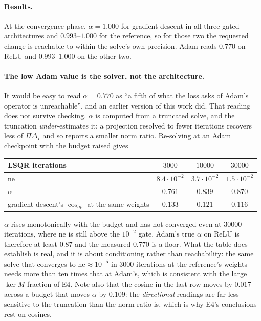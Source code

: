 \documentclass{article} %
\theoremstyle{plain}
\theoremstyle{definition}
\theoremstyle{remark}
\begin{document}
\paragraph{Results.}
At the convergence phase, $\alpha = 1.000$ for gradient descent in all three gated architectures and
$0.993$--$1.000$ for the reference, so for those two the requested change is reachable to within the
solve's own precision. Adam reads $0.770$ on ReLU and $0.993$--$1.000$ on the other two.

\paragraph{The low Adam value is the solver, not the architecture.} It would be easy to read
$\alpha = 0.770$ as ``a fifth of what the loss asks of Adam's operator is unreachable'', and an
earlier version of this work did. That reading does not survive checking. $\alpha$ is computed from
a truncated solve, and the truncation \emph{under}-estimates it: a projection resolved to fewer
iterations recovers less of $\Pi\Delta_\star$ and so reports a smaller norm ratio. Re-solving at an
Adam checkpoint with the budget raised gives

\begin{center}\small
\begin{tabular}{lccc}
\toprule
LSQR iterations & $3000$ & $10000$ & $30000$ \\
\midrule
$\mathrm{ne}$ & $8.4\cdot10^{-2}$ & $3.7\cdot10^{-2}$ & $1.5\cdot10^{-2}$ \\
$\alpha$      & $0.761$ & $0.839$ & $0.870$ \\
gradient descent's $\cos_{op}$ at the same weights & $0.133$ & $0.121$ & $0.116$ \\
\bottomrule
\end{tabular}
\end{center}

\noindent$\alpha$ rises monotonically with the budget and has not converged even at $30000$
iterations, where $\mathrm{ne}$ is still above the $10^{-2}$ gate. Adam's true $\alpha$ on ReLU is
therefore at least $0.87$ and the measured $0.770$ is a floor. What the table does establish is
real, and it is about conditioning rather than reachability: the same solve that converges to
$\mathrm{ne} \approx 10^{-5}$ in $3000$ iterations at the reference's weights needs more than ten
times that at Adam's, which is consistent with the large $\ker M$ fraction of E4. Note also that
the cosine in the last row moves by $0.017$ across a budget that moves $\alpha$ by $0.109$: the
\emph{directional} readings are far less sensitive to the truncation than the norm ratio is, which
is why E4's conclusions rest on cosines.
\end{document}
